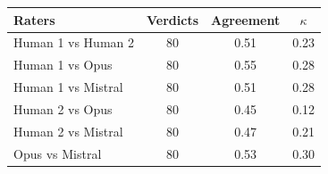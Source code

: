 \begin{tabular}{lccc}
\toprule
Raters & Verdicts & Agreement & $\kappa$ \\
\midrule
Human 1 vs Human 2 & 80 & 0.51 & 0.23 \\
Human 1 vs Opus & 80 & 0.55 & 0.28 \\
Human 1 vs Mistral & 80 & 0.51 & 0.28 \\
Human 2 vs Opus & 80 & 0.45 & 0.12 \\
Human 2 vs Mistral & 80 & 0.47 & 0.21 \\
Opus vs Mistral & 80 & 0.53 & 0.30 \\
\bottomrule
\end{tabular}
